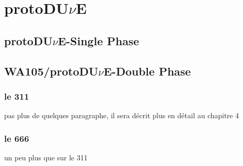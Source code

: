   \section{\texorpdfstring{protoDU$\nu$E}{protoDUNE}}
    \subsection{\texorpdfstring{protoDU$\nu$E}{protoDUNE}-Single Phase}
    \subsection{WA105/\texorpdfstring{protoDU$\nu$E}{protoDUNE}-Double Phase}
      \subsubsection{le 311}
        pas plus de quelques paragraphe, il sera décrit plus en détail au chapitre 4
      \subsubsection{le 666}
        un peu plus que sur le 311
\printbibliography